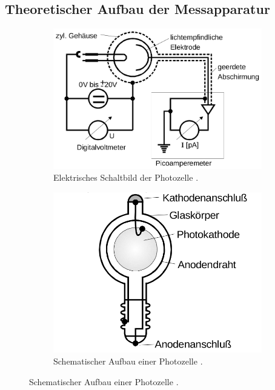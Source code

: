 \subsection{Theoretischer Aufbau der Messapparatur}
\label{sec:Versuchsaufbau}

\begin{figure}
    \centering
    \begin{subfigure}{0.48\textwidth}
        \includegraphics[width=\textwidth]{Bilder/schaltbild.png}
        \caption{Elektrisches Schaltbild der Photozelle \cite{Anleitung}.}
        \label{fig:schalte}
    \end{subfigure}
    \begin{subfigure}{0.48\textwidth}
        \includegraphics[width=\textwidth]{Bilder/aufbau_photozelle.png}
        \caption{Schematischer Aufbau einer Photozelle \cite{Anleitung}.}
        \label{fig:photozelle}
    \end{subfigure}
\end{figure}
